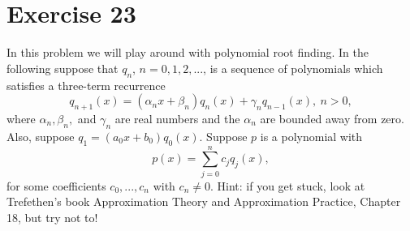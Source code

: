 \newpage
\section{Exercise 23}
In this problem we will play around with polynomial root finding. In the following suppose that $q_n$, $n = 0, 1, 2, ...$,  is a sequence of polynomials which satisfies a three-term recurrence 
\[q_{n+1}(x) = (\alpha_nx + \beta_n)q_n(x) + \gamma_nq_{n-1}(x), \ n > 0,\]
where $\alpha_n, \beta_n,$ and $\gamma_n$ are real numbers and the $\alpha_n$ are bounded away from zero. Also, suppose $q_1 = (a_0x + b_0)q_0(x).$ Suppose $p$ is a polynomial with 
\[p(x) = \sum_{j = 0}^n c_jq_j(x),\]
for some coefficients $c_0, ..., c_n$ with $c_n \neq 0$. Hint: if you get stuck, look at Trefethen’s book Approximation Theory and Approximation Practice, Chapter 18, but try not to!

